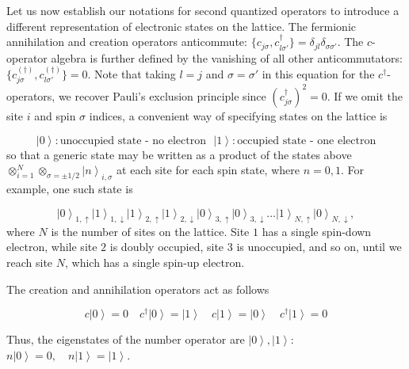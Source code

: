 Let us now establish our notations for second quantized operators to introduce a different representation of electronic states on the lattice.
The fermionic annihilation and creation operators anticommute:
$\{ c_{j\sigma} , c_{l \sigma'}^\dagger \} = \delta_{jl} \delta_{\sigma\sigma'}$.
The $c$-operator algebra is further defined by the vanishing of all other anticommutators:$
\{ c_{j\sigma}^{(\dagger)} , c_{l \sigma'}^{(\dagger)} \} = 0$.
Note that taking $l = j$ and $\sigma = \sigma'$ in this equation for the $c^\dagger$-operators, we recover Pauli's exclusion principle since $(c_{j\sigma}^\dagger)^2 = 0$.
If we omit the site $i$ and spin $\sigma$ indices, a convenient way of specifying states on the lattice is

\begin{equation}
\left| 0 \right\rangle : \text{unoccupied state - no electron} \,\,\,\, \left| 1 \right\rangle : \text{occupied state - one electron}
\end{equation}
so that a generic state may be written as a product of the states above $\otimes_{i=1}^{N} \otimes_{\sigma = \pm 1/2} \left| n \right\rangle_{i, \sigma}$ at each site for each spin state, where $n= 0, 1$.
For example, one such state is

\begin{equation}
\left| 0 \right\rangle_{1, \uparrow} \left| 1 \right\rangle_{1, \downarrow} \left| 1 \right\rangle_{2, \uparrow} \left| 1 \right\rangle_{2, \downarrow} \left| 0 \right\rangle_{3, \uparrow} \left| 0 \right\rangle_{3, \downarrow} ... \left| 1 \right\rangle_{N, \uparrow} \left| 0 \right\rangle_{N, \downarrow}  ,
\end{equation}
where $N$ is the number of sites on the lattice. Site $1$ has a single spin-down electron, while site $2$ is doubly occupied, site $3$ is unoccupied, and so on, until we reach site $N$, which has a single spin-up electron.

The creation and annihilation operators act as follows

\begin{equation}
c \left| 0 \right\rangle = 0 \quad c^\dagger \left| 0 \right\rangle = \left| 1 \right\rangle \quad c \left| 1 \right\rangle = \left| 0 \right\rangle \quad c^\dagger \left| 1 \right\rangle = 0
\end{equation}

Thus, the eigenstates of the number operator are $\left| 0 \right\rangle, \left| 1 \right\rangle$: $
n \left| 0 \right\rangle = 0 , \quad n \left| 1 \right\rangle = \left| 1 \right\rangle
$.

